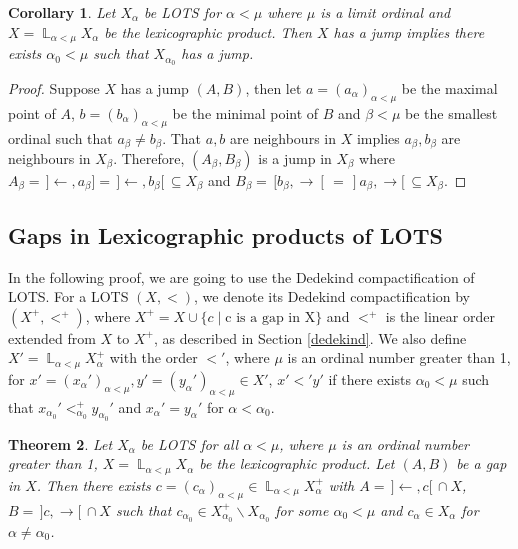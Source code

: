 \documentclass[12pt,oneside,english]{amsbook}
\numberwithin{equation}{section} %
\numberwithin{figure}{section} %
\theoremstyle{plain}
\numberwithin{section}{chapter}
\newtheorem{thm}{Theorem}[section]
\theoremstyle{plain}
\newtheorem{corollary}[thm]{Corollary}
\DeclareMathOperator{\LP}{\mathbb{L}}
\begin{document}
\begin{corollary} \label{lem:ljump:2}
  Let $X_{\alpha}$ be LOTS for $\alpha < \mu$ where $\mu$ is a limit ordinal and $X = \LP_{\alpha < \mu}X_{\alpha}$ be the lexicographic product. Then $X$ has a jump implies there exists $\alpha_{0} < \mu$ such that $X_{\alpha_{0}}$ has a jump.
\end{corollary}
\begin{proof}
  Suppose $X$ has a jump $(A,B)$, then let $a = (a_{\alpha})_{\alpha < \mu}$ be the maximal point of $A$, $b = (b_{\alpha})_{\alpha < \mu}$ be the minimal point of $B$ and $\beta < \mu$ be the smallest ordinal such that $a_{\beta} \neq b_{\beta}$. That $a,b$ are neighbours in $X$ implies $a_{\beta}, b_{\beta}$ are neighbours in $X_{\beta}$. Therefore, $(A_{\beta}, B_{\beta})$ is a jump in $X_{\beta}$ where $A_{\beta} = \, ]\leftarrow, a_{\beta}]  = \, ]\leftarrow, b_{\beta}[ \, \subseteq X_{\beta}$ and $B_{\beta} = \, [b_{\beta}, \rightarrow[ \, = \, ]a_{\beta}, \rightarrow [ \, \subseteq X_{\beta}$.

\end{proof}

\subsection{Gaps in Lexicographic products of LOTS}


In the following proof, we are going to use the Dedekind compactification of LOTS. For a LOTS $(X, <)$, we denote its Dedekind compactification by $(X^+,<^+)$, where $X^+ = X \cup \{c \; | \; \text{c is a gap in X}\}$ and $<^+$ is the linear order extended from $X$ to $X^+$, as described in Section \ref{dedekind}.
We also define $X' = \LP_{\alpha < \mu}X_{\alpha}^+$ with the order $<'$, where $\mu$ is an ordinal number greater than 1, for $x' = (x_{\alpha}')_{\alpha < \mu}, y' = (y_{\alpha}')_{\alpha < \mu} \in X'$, $x' <' y'$ if there exists $\alpha_0 < \mu$ such that $x_{\alpha_0}' <_{\alpha_0}^+ y_{\alpha_0}'$ and $x_{\alpha}' = y_{\alpha}'$ for $\alpha < \alpha_0$.
\begin{thm} \label{lem:lgap:1}
  Let $X_{\alpha}$ be LOTS for all $\alpha < \mu$, where $\mu$ is an ordinal number greater than 1, $X =  \LP_{\alpha < \mu} X_{\alpha}$ be the lexicographic product.
Let $(A,B)$ be a gap in $X$. Then there exists $c  = (c_{\alpha})_{\alpha < \mu} \in \LP_{\alpha < \mu}X_{\alpha}^+$ with $A = \,]\leftarrow,c[ \, \cap X$, $B = \, ]c,\rightarrow[ \, \cap X$ such that $c_{\alpha_{0}} \in X_{\alpha_0}^+ \backslash X_{\alpha_{0}}$ for some $\alpha_0 < \mu$ and $c_{\alpha}  \in X_{\alpha}$ for $\alpha \neq \alpha_{0}$.
\end{thm}
\end{document}

